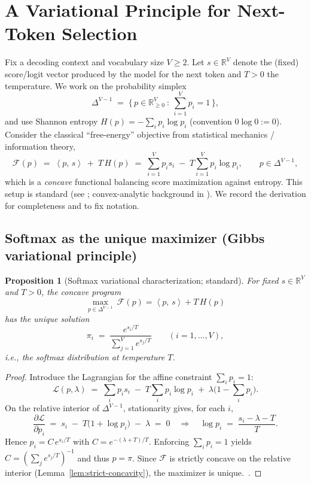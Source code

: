 \documentclass[11pt,reqno]{article}
\numberwithin{equation}{section}
\theoremstyle{plain}
\newtheorem{proposition}[theorem]{Proposition}
\theoremstyle{definition}
\theoremstyle{remark}
\newcommand{\R}{\mathbb{R}}
\newcommand{\1}{\mathbbm{1}}
\newcommand{\ip}[2]{\left\langle #1,\, #2 \right\rangle}
\newcommand{\Hent}{H}
\newcommand{\simplex}{\Delta^{V-1}}
\begin{document}
\section{A Variational Principle for Next-Token Selection}\label{sec:variational}

Fix a decoding context and vocabulary size $V\ge 2$. Let $s\in\R^V$ denote the (fixed) score/logit vector produced by the model for the next token and $T>0$ the temperature. We work on the probability simplex
\[
\simplex \;=\; \big\{\, p\in\R^V_{\ge 0}\ :\ \sum_{i=1}^V p_i = 1 \,\big\},
\]
and use Shannon entropy $\Hent(p)=-\sum_i p_i\log p_i$ (convention $0\log 0:=0$). Consider the
classical “free-energy” objective from statistical mechanics / information theory,
\begin{equation}\label{eq:free-energy}
\mathcal{F}(p)\;=\;\ip{p}{s}\;+\;T\,\Hent(p)
\;=\;\sum_{i=1}^V p_i s_i \;-\; T\sum_{i=1}^V p_i \log p_i,
\qquad p\in\simplex,
\end{equation}
which is a \emph{concave} functional balancing score maximization against entropy. This setup is standard
(see \citep{jaynes1957information,cover2006elements}; convex-analytic background in \citealp[Ch.~3]{boyd2004convex}).
We record the derivation for completeness and to fix notation.

\subsection{Softmax as the unique maximizer (Gibbs variational principle)}
\begin{proposition}[Softmax variational characterization; standard]\label{prop:softmax-variational}
For fixed $s\in\R^V$ and $T>0$, the concave program
\[
\max_{p\in\simplex}\ \mathcal{F}(p)=\ip{p}{s}+T\,\Hent(p)
\]
has the unique solution
\[
\pi_i \;=\; \frac{e^{s_i/T}}{\sum_{j=1}^V e^{s_j/T}}
\qquad (i=1,\dots,V),
\]
i.e., the softmax distribution at temperature $T$.
\end{proposition}

\begin{proof}
Introduce the Lagrangian for the affine constraint $\sum_i p_i=1$:
\[
\mathcal{L}(p,\lambda)\;=\;\sum_i p_i s_i \;-\; T\sum_i p_i\log p_i \;+\; \lambda\Big(1-\sum_i p_i\Big).
\]
On the relative interior of $\simplex$, stationarity gives, for each $i$,
\[
\frac{\partial \mathcal{L}}{\partial p_i}\;=\; s_i \;-\; T\big(1+\log p_i\big)\;-\;\lambda \;=\; 0
\quad\Rightarrow\quad
\log p_i\;=\;\frac{s_i-\lambda - T}{T}.
\]
Hence $p_i = C\,e^{s_i/T}$ with $C=e^{-(\lambda+T)/T}$. Enforcing $\sum_i p_i=1$ yields
$C=(\sum_j e^{s_j/T})^{-1}$ and thus $p=\pi$. Since $\mathcal{F}$ is strictly concave on the relative interior (Lemma~\ref{lem:strict-concavity}), the maximizer is unique.\ \citep[See also the classical Gibbs principle in][]{jaynes1957information,cover2006elements}.
\end{proof}
\end{document}
